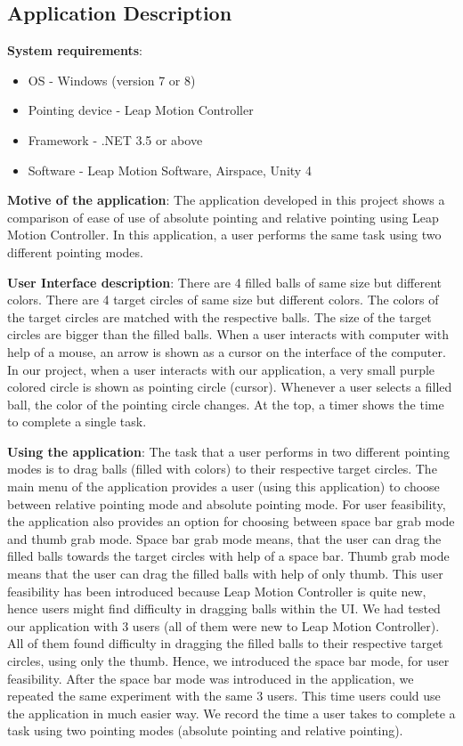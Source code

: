 \documentclass{article}
\begin{document}
\subsection{Application Description}

{\bf System requirements}:
\begin{itemize}
\item OS - Windows (version 7 or 8)
\item Pointing device - Leap Motion Controller
\item Framework - .NET 3.5 or above
\item Software - Leap Motion Software, Airspace, Unity 4 
\end{itemize}

{\bf Motive of the application}: The application developed in this project shows a comparison of ease of use of absolute pointing and relative pointing using Leap Motion Controller. In this application, a user performs the same task using two different pointing modes. 

{\bf User Interface description}: There are 4 filled balls of same size but different colors. There are 4 target circles of same size but different colors. The colors of the target circles are matched with the respective balls. The size of the target circles are bigger than the filled balls. When a user interacts with computer with help of a mouse, an arrow is shown as a cursor on the interface of the computer. In our project, when a user interacts with our application, a very small purple colored circle is shown as pointing circle (cursor). Whenever a user selects a filled ball, the color of the pointing circle changes. At the top, a timer shows the time to complete a single task.

{\bf Using the application}: The task that a user performs in two different pointing modes is to drag balls (filled with colors) to their respective target circles. The main menu of the application  provides a user (using this application) to choose between relative pointing mode and absolute pointing mode. For user feasibility, the application also provides an option for choosing between space bar grab mode and thumb grab mode. Space bar grab mode means, that the user can drag the filled balls towards the target circles with help of a space bar. Thumb grab mode means that the user can drag the filled balls with help of only thumb. This user feasibility has been introduced because Leap Motion Controller is quite new, hence users might find difficulty in dragging balls within the UI. We had tested our application with 3 users (all of them were new to Leap Motion Controller). All of them found difficulty in dragging the filled balls to their respective target circles, using only the thumb. Hence, we introduced the space bar mode, for user feasibility. After the space bar mode was introduced in the application, we repeated the same experiment with the same 3 users. This time users could use the application in much easier way. We record the time a user takes to complete a task using two pointing modes (absolute pointing and relative pointing).
\end{document}
